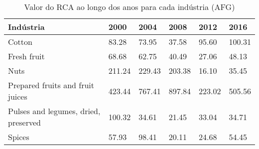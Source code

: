 \begin{table}
\centering
\caption{Valor do RCA ao longo dos anos para cada indústria (AFG)}
\begin{tabular}{p{6cm}p{1.5cm}p{1.5cm}p{1.5cm}p{1.5cm}p{1.5cm}}
\toprule
                           Indústria &   2000 &   2004 &   2008 &   2012 &   2016 \\
\midrule
                              Cotton &  83.28 &  73.95 &  37.58 &  95.60 & 100.31 \\
                         Fresh fruit &  68.68 &  62.75 &  40.49 &  27.06 &  48.13 \\
                                Nuts & 211.24 & 229.43 & 203.38 &  16.10 &  35.45 \\
    Prepared fruits and fruit juices & 423.44 & 767.41 & 897.84 & 223.02 & 505.56 \\
Pulses and legumes, dried, preserved & 100.32 &  34.61 &  21.45 &  33.04 &  34.71 \\
                              Spices &  57.93 &  98.41 &  20.11 &  24.68 &  54.45 \\
\bottomrule
\end{tabular}
\end{table}
